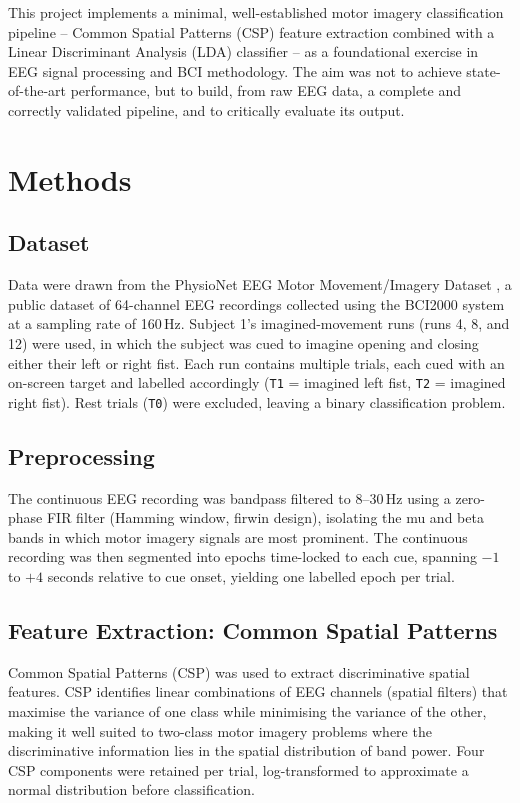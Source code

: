 \documentclass[conference]{IEEEtran}
\begin{document}
This project implements a minimal, well-established motor imagery classification pipeline -- Common Spatial Patterns (CSP) feature extraction combined with a Linear Discriminant Analysis (LDA) classifier -- as a foundational exercise in EEG signal processing and BCI methodology. The aim was not to achieve state-of-the-art performance, but to build, from raw EEG data, a complete and correctly validated pipeline, and to critically evaluate its output.

\section{Methods}

\subsection{Dataset}

Data were drawn from the PhysioNet EEG Motor Movement/Imagery Dataset \cite{schalk2004}, a public dataset of 64-channel EEG recordings collected using the BCI2000 system at a sampling rate of 160\,Hz. Subject 1's imagined-movement runs (runs 4, 8, and 12) were used, in which the subject was cued to imagine opening and closing either their left or right fist. Each run contains multiple trials, each cued with an on-screen target and labelled accordingly (\texttt{T1} = imagined left fist, \texttt{T2} = imagined right fist). Rest trials (\texttt{T0}) were excluded, leaving a binary classification problem.

\subsection{Preprocessing}

The continuous EEG recording was bandpass filtered to 8--30\,Hz using a zero-phase FIR filter (Hamming window, firwin design), isolating the mu and beta bands in which motor imagery signals are most prominent. The continuous recording was then segmented into epochs time-locked to each cue, spanning $-1$ to $+4$ seconds relative to cue onset, yielding one labelled epoch per trial.

\subsection{Feature Extraction: Common Spatial Patterns}

Common Spatial Patterns (CSP) \cite{ramoser2000} was used to extract discriminative spatial features. CSP identifies linear combinations of EEG channels (spatial filters) that maximise the variance of one class while minimising the variance of the other, making it well suited to two-class motor imagery problems where the discriminative information lies in the spatial distribution of band power. Four CSP components were retained per trial, log-transformed to approximate a normal distribution before classification.
\end{document}
